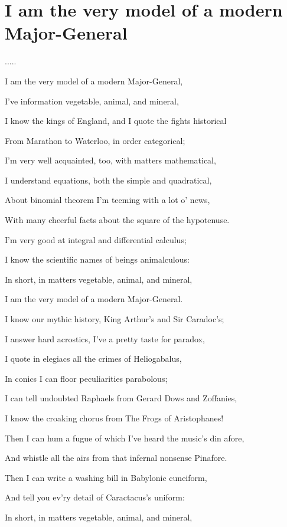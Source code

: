 \documentclass{article}
\begin{document}
\section{I am the very model of a modern Major-General}

.....

    I am the very model of a modern Major-General,

    I've information vegetable, animal, and mineral,

    I know the kings of England, and I quote the fights historical

    From Marathon to Waterloo, in order categorical;

    I'm very well acquainted, too, with matters mathematical,

    I understand equations, both the simple and quadratical,

    About binomial theorem I'm teeming with a lot o' news,

    With many cheerful facts about the square of the hypotenuse.


    I'm very good at integral and differential calculus;

    I know the scientific names of beings animalculous:

    In short, in matters vegetable, animal, and mineral,

    I am the very model of a modern Major-General.


    I know our mythic history, King Arthur's and Sir Caradoc's;

    I answer hard acrostics, I've a pretty taste for paradox,

    I quote in elegiacs all the crimes of Heliogabalus,

    In conics I can floor peculiarities parabolous;

    I can tell undoubted Raphaels from Gerard Dows and Zoffanies,

    I know the croaking chorus from The Frogs of Aristophanes!

    Then I can hum a fugue of which I've heard the music's din afore,

    And whistle all the airs from that infernal nonsense Pinafore.

    Then I can write a washing bill in Babylonic cuneiform,

    And tell you ev'ry detail of Caractacus's uniform:

    In short, in matters vegetable, animal, and mineral,
\end{document}
